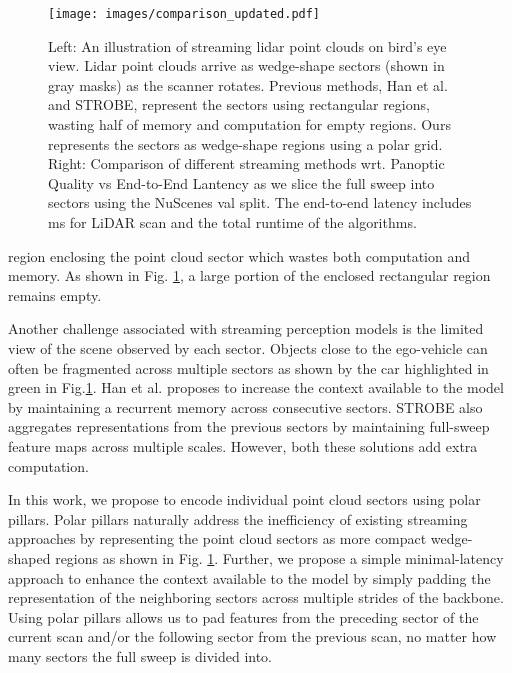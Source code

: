 \documentclass{article}
\begin{document}
\begin{figure}
  \centering 
\texttt{[image: images/comparison\_updated.pdf]} 
  \caption{Left: An illustration of streaming lidar point clouds on bird's eye view. Lidar point clouds arrive as wedge-shape sectors (shown in gray masks) as the scanner rotates. Previous methods, Han et al.\cite{han2020streaming} and STROBE\cite{frossard2020strobe}, represent the sectors using rectangular regions, wasting half of memory and computation for empty regions. Ours represents the sectors as wedge-shape regions using a polar grid. Right: Comparison of different streaming methods wrt. Panoptic Quality vs End-to-End Lantency as we slice the full sweep into  sectors using the NuScenes\cite{caesar2019nuscenes} val split. The end-to-end latency includes  ms for LiDAR scan and the total runtime of the algorithms.}\label{fig:packets}
\end{figure}\vspace{-3mm}

region enclosing the point cloud sector which wastes both computation and memory. As shown in Fig. \ref{fig:packets}, a large portion of the enclosed rectangular region remains empty. 

Another challenge associated with streaming perception models is the limited view of the scene observed by each sector. Objects close to the ego-vehicle can often be fragmented across multiple sectors as shown by the car highlighted in green in Fig.\ref{fig:packets}. Han et al.\cite{han2020streaming} proposes to increase the context available to the model by maintaining a recurrent memory across consecutive sectors. STROBE \cite{frossard2020strobe} also aggregates representations from the previous sectors by maintaining full-sweep feature maps across multiple scales. However, both these solutions add extra computation.


In this work, we propose to encode individual point cloud sectors using polar pillars. Polar pillars naturally address the inefficiency of existing streaming approaches by representing the point cloud sectors as more compact wedge-shaped regions as shown in Fig. \ref{fig:packets}. Further, we propose a simple minimal-latency approach to enhance the context available to the model by simply padding the representation of the neighboring sectors across multiple strides of the backbone. Using polar pillars allows us to pad features from the preceding sector of the current scan and/or the following sector from the previous scan, no matter how many sectors the full sweep is divided into.
\end{document}
